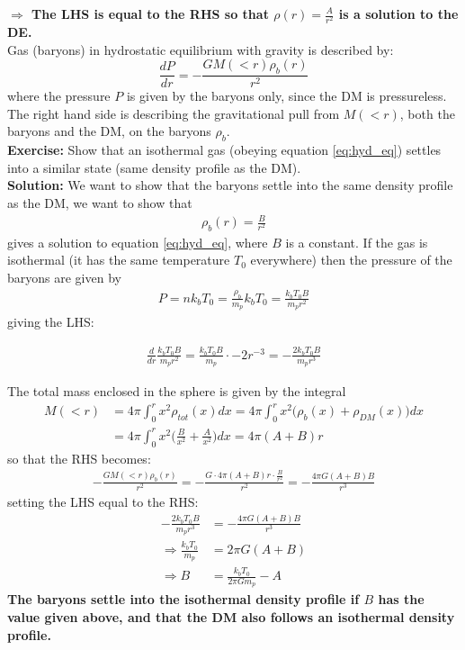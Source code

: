 \documentclass[paper=a4, fontsize=11pt]{scrartcl} %
\numberwithin{figure}{section} %
\numberwithin{table}{section} %
\begin{document}
\textbf{$\Rightarrow$ The LHS is equal to the RHS so that $\rho(r) = \frac{A}{r^2}$ is a solution to the DE.} \\

Gas (baryons) in hydrostatic equilibrium with gravity is described by:
\begin{equation}
\frac{dP}{dr} = -\frac{GM(<r) \rho_b(r)}{r^2}
\label{eq:hyd_eq}
\end{equation}
where the pressure $P$ is given by the baryons only, since the DM is pressureless. The right hand side is describing the gravitational pull from $M(<r)$, both the baryons and the DM, on the baryons $\rho_b$. \\

\textbf{Exercise:} Show that an isothermal gas (obeying equation \ref{eq:hyd_eq}) settles into a similar state (same density profile as the DM).\\

\textbf{Solution:} We want to show that the baryons settle into the same density profile as the DM, we want to show that
\begin{align*}
\rho_b(r) = \frac{B}{r^2}
\end{align*}
gives a solution to equation \ref{eq:hyd_eq}, where $B$ is a constant. If the gas is isothermal (it has the same temperature $T_0$ everywhere) then the pressure of the baryons are given by
\begin{align*}
P = nk_bT_0 = \frac{\rho_b}{m_p}k_bT_0 = \frac{k_bT_0B}{m_pr^2}
\end{align*}
giving the LHS:

\begin{align*}
\frac{d}{dr} \frac{k_bT_0B}{m_pr^2} = \frac{k_bT_0B}{m_p} \cdot -2r^{-3} = -\frac{2k_bT_0B}{m_pr^3}  
\end{align*}

The total mass enclosed in the sphere is given by the integral
\begin{align*}
M(<r) &= 4\pi \int_0^r x^2 \rho_{tot} (x) dx = 4\pi \int_0^r x^2 \bigg(\rho_b(x) + \rho_{DM}(x)\bigg) dx \\
&= 4\pi \int_0^r x^2 \Bigg(\frac{B}{x^2} + \frac{A}{x^2}\Bigg) dx = 4\pi (A+B)r
\end{align*}
so that the RHS becomes:
\begin{align*}
-\frac{GM(<r)\rho_b(r)}{r^2} = -\frac{G\cdot  4\pi (A+B)r \cdot \frac{B}{r^2}}{r^2} = -\frac{4\pi G(A+B)B}{r^3}
\end{align*}
setting the LHS equal to the RHS:
\begin{align*}
-\frac{2k_bT_0B}{m_pr^3} &= -\frac{4\pi G(A+B)B}{r^3} \\
\Rightarrow \frac{k_bT_0}{m_p} &= 2\pi G(A+B) \\
\Rightarrow  B &= \frac{k_bT_0}{2\pi G m_p} - A 
\end{align*}
\textbf{The baryons settle into the isothermal density profile if $B$ has the value given above, and that the DM also follows an isothermal density profile. }
\end{document}
